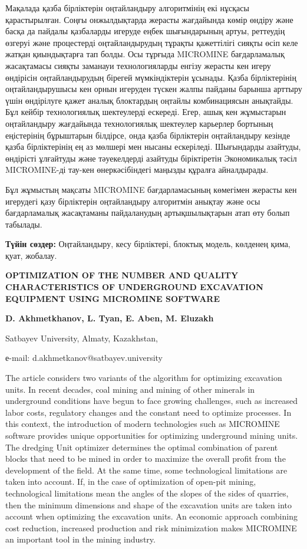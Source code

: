 Мақалада қазба бірліктерін оңтайландыру алгоритмінің екі нұсқасы
қарастырылған. Соңғы онжылдықтарда жерасты жағдайында көмір өндіру және
басқа да пайдалы қазбаларды игеруде еңбек шығындарының артуы, реттеудің
өзгеруі және процестерді оңтайландырудың тұрақты қажеттілігі сияқты өсіп
келе жатқан қиындықтарға тап болды. Осы тұрғыда MICROMINE бағдарламалық
жасақтамасы сияқты заманауи технологияларды енгізу жерасты кен игеру
өндірісін оңтайландырудың бірегей мүмкіндіктерін ұсынады. Қазба
бірліктерінің оңтайландырушысы кен орнын игеруден түскен жалпы пайданы
барынша арттыру үшін өндірілуге қажет аналық блоктардың оңтайлы
комбинациясын анықтайды. Бұл кейбір технологиялық шектеулерді ескереді.
Егер, ашық кен жұмыстарын оңтайландыру жағдайында технологиялық
шектеулер карьерлер бортының еңістерінің бұрыштарын білдірсе, онда қазба
бірліктерін оңтайландыру кезінде қазба бірліктерінің ең аз мөлшері мен
нысаны ескеріледі. Шығындарды азайтуды, өндірісті ұлғайтуды және
тәуекелдерді азайтуды біріктіретін Экономикалық тәсіл MICROMINE-ді
тау-кен өнеркәсібіндегі маңызды құралға айналдырады.

Бұл жұмыстың мақсаты MICROMINE бағдарламасының көмегімен жерасты кен
игерудегі қазу бірліктерін оңтайландыру алгоритмін анықтау және осы
бағдарламалық жасақтаманы пайдаланудың артықшылықтарын атап өту болып
табылады.

{\bfseries Түйін сөздер:} Оңтайландыру, кесу бірліктері, блоктық модель,
көлденең қима, қуат, жобалау.

\begin{center}
{\large\bfseries OPTIMIZATION OF THE NUMBER AND QUALITY CHARACTERISTICS OF
UNDERGROUND EXCAVATION EQUIPMENT USING MICROMINE SOFTWARE}

{\bfseries D. Akhmetkhanov\envelope, L. Tyan, E. Aben, M.
Eluzakh}

Satbayev University, Almaty, Kazakhstan,

е-mail: d.akhmetkanov@satbayev.university
\end{center}

The article considers two variants of the algorithm for optimizing
excavation units. In recent decades, coal mining and mining of other
minerals in underground conditions have begun to face growing
challenges, such as increased labor costs, regulatory changes and the
constant need to optimize processes. In this context, the introduction
of modern technologies such as MICROMINE software provides unique
opportunities for optimizing underground mining units. The dredging Unit
optimizer determines the optimal combination of parent blocks that need
to be mined in order to maximize the overall profit from the development
of the field. At the same time, some technological limitations are taken
into account. If, in the case of optimization of open-pit mining,
technological limitations mean the angles of the slopes of the sides of
quarries, then the minimum dimensions and shape of the excavation units
are taken into account when optimizing the excavation units. An economic
approach combining cost reduction, increased production and risk
minimization makes MICROMINE an important tool in the mining industry.


